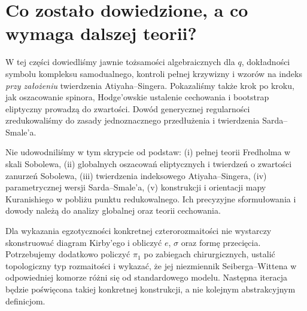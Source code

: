 \section{Co zostało dowiedzione, a co wymaga dalszej teorii?}
\label{sec:tg-sw12-scope}

W tej części dowiedliśmy jawnie tożsamości algebraicznych
dla $q$, dokładności symbolu kompleksu samodualnego,
kontroli pełnej krzywizny i wzorów na indeks
\emph{przy założeniu} twierdzenia Atiyaha--Singera.
Pokazaliśmy także krok po kroku, jak oszacowanie spinora,
Hodge'owskie ustalenie cechowania i bootstrap eliptyczny
prowadzą do zwartości. Dowód generycznej regularności
zredukowaliśmy do zasady jednoznacznego przedłużenia
i twierdzenia Sarda--Smale'a.

Nie udowodniliśmy w tym skrypcie od podstaw:
(i) pełnej teorii Fredholma w skali Sobolewa,
(ii) globalnych oszacowań eliptycznych i twierdzeń o
zwartości zanurzeń Sobolewa,
(iii) twierdzenia indeksowego Atiyaha--Singera,
(iv) parametrycznej wersji Sarda--Smale'a,
(v) konstrukcji i orientacji mapy Kuranishiego
w pobliżu punktu redukowalnego. Ich precyzyjne
sformułowania i dowody należą do analizy globalnej
oraz teorii cechowania.

\begin{uwaga}
Dla wykazania egzotyczności konkretnej czterorozmaitości
nie wystarczy skonstruować diagram Kirby'ego i obliczyć
$e$, $\sigma$ oraz formę przecięcia. Potrzebujemy dodatkowo
policzyć $\pi_1$ po zabiegach chirurgicznych,
ustalić topologiczny typ rozmaitości i wykazać, że
jej niezmiennik Seiberga--Wittena w odpowiedniej
komorze różni się od standardowego modelu.
Następna iteracja będzie poświęcona takiej konkretnej
konstrukcji, a nie kolejnym abstrakcyjnym definicjom.
\end{uwaga}


